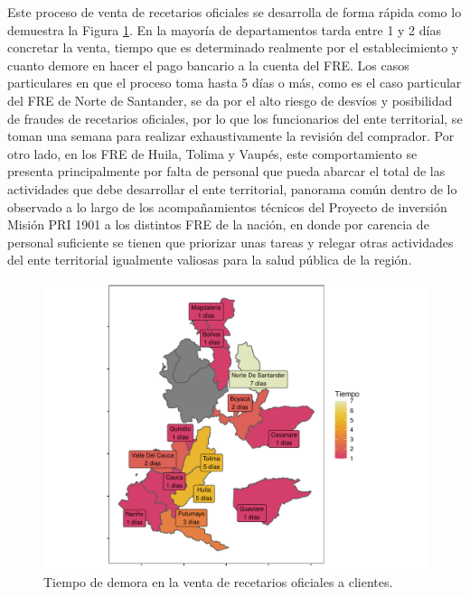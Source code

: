 \documentclass[
]{book}
\begin{document}
Este proceso de venta de recetarios oficiales se desarrolla de forma rápida como lo demuestra la Figura \ref{fig:TiempoVentaInstituciones}. En la mayoría de departamentos tarda entre 1 y 2 días concretar la venta, tiempo que es determinado realmente por el establecimiento y cuanto demore en hacer el pago bancario a la cuenta del FRE. Los casos particulares en que el proceso toma hasta 5 días o más, como es el caso particular del FRE de Norte de Santander, se da por el alto riesgo de desvíos y posibilidad de fraudes de recetarios oficiales, por lo que los funcionarios del ente territorial, se toman una semana para realizar exhaustivamente la revisión del comprador. Por otro lado, en los FRE de Huila, Tolima y Vaupés, este comportamiento se presenta principalmente por falta de personal que pueda abarcar el total de las actividades que debe desarrollar el ente territorial, panorama común dentro de lo observado a lo largo de los acompañamientos técnicos del Proyecto de inversión Misión PRI 1901 a los distintos FRE de la nación, en donde por carencia de personal suficiente se tienen que priorizar unas tareas y relegar otras actividades del ente territorial igualmente valiosas para la salud pública de la región.

\begin{figure}

{\centering \includegraphics[width=0.9\linewidth]{InformeFinal_files/figure-latex/TiempoVentaInstituciones-1} 

}

\caption{Tiempo de demora en la venta de recetarios oficiales a clientes.}\label{fig:TiempoVentaInstituciones}
\end{figure}
\end{document}

